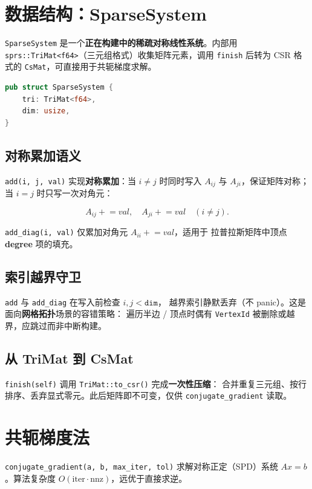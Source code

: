 \documentclass[11pt,a4paper]{article}
\begin{document}
\section{数据结构：SparseSystem}

\texttt{SparseSystem} 是一个\textbf{正在构建中的稀疏对称线性系统}。内部用
\texttt{sprs::TriMat<f64>}（三元组格式）收集矩阵元素，调用 \texttt{finish}
后转为 CSR 格式的 \texttt{CsMat}，可直接用于共轭梯度求解。

\begin{lstlisting}[language=Rust]
pub struct SparseSystem {
    tri: TriMat<f64>,
    dim: usize,
}
\end{lstlisting}

\subsection{对称累加语义}

\texttt{add(i, j, val)} 实现\textbf{对称累加}：当 $i \ne j$ 时同时写入
$A_{ij}$ 与 $A_{ji}$，保证矩阵对称；当 $i = j$ 时只写一次对角元：

\[
  A_{ij} \mathrel{+}= val,\quad
  A_{ji} \mathrel{+}= val \quad (i \ne j).
\]

\texttt{add\_diag(i, val)} 仅累加对角元 $A_{ii} \mathrel{+}= val$，适用于
拉普拉斯矩阵中顶点 \textbf{degree} 项的填充。

\subsection{索引越界守卫}

\texttt{add} 与 \texttt{add\_diag} 在写入前检查 $i, j < \texttt{dim}$，
越界索引静默丢弃（不 panic）。这是面向\textbf{网格拓扑}场景的容错策略：
遍历半边 / 顶点时偶有 \texttt{VertexId} 被删除或越界，应跳过而非中断构建。

\subsection{从 TriMat 到 CsMat}

\texttt{finish(self)} 调用 \texttt{TriMat::to\_csr()} 完成\textbf{一次性压缩}：
合并重复三元组、按行排序、丢弃显式零元。此后矩阵即不可变，仅供
\texttt{conjugate\_gradient} 读取。

\section{共轭梯度法}

\texttt{conjugate\_gradient(a, b, max\_iter, tol)} 求解对称正定（SPD）系统
$Ax = b$。算法复杂度 $O(\text{iter} \cdot \text{nnz})$，远优于直接求逆。
\end{document}
